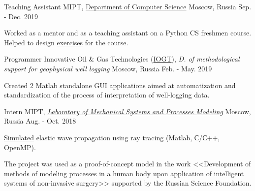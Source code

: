 \begin{cventries}

  \cventry
    {Teaching Assistant} %
    {MIPT, \hspace{5pt} \href{http://cs.mipt.ru/}{Department of Computer Science}} %
    {Moscow, Russia} %
    {Sep. - Dec. 2019} %
    {
      \begin{cvitems} %
        \item {Worked as a mentor and as a teaching assistant on a Python CS freshmen course. Helped to design \href{http://cs.mipt.ru/python}{exercises} for the course.}
      \end{cvitems}
    }
    

  \cventry
    {Programmer} %
    {Innovative Oil \& Gas Technologies (\href{http://www.iogt.ru/eng/}{IOGT}), \textit{D. of methodological support for geophysical well logging}} %
    {Moscow, Russia} %
    {Feb. - May. 2019} %
    {
      \begin{cvitems} %
        \item {Created 2 Matlab standalone GUI applications aimed at automatization and standardization of the process of interpretation of well-logging data.}
      \end{cvitems}
    }


  \cventry
    {Intern} %
    {MIPT, \hspace{5pt} \textit{\href{https://mipt.ru/science/labs/laboratoriya-modelirovaniya-mekhanicheskikh-sistem-i-protsessov/}{Laboratory of Mechanical Systems and Processes Modeling}}} %
    {Moscow, Russia} %
    {Aug. - Oct. 2018} %
    {
      \begin{cvitems} %
        \item {\href{https://github.com/PolyachenkoYA/geo}{Simulated} elastic wave propagation using ray tracing (Matlab, С/С++, OpenMP).}
        \item {The project was used as a proof-of-concept model in the work <<Development of methods of modeling processes in a human body upon application of intelligent systems of non-invasive surgery>> supported by the Russian Science Foundation.}
      \end{cvitems}
    }

\end{cventries}
